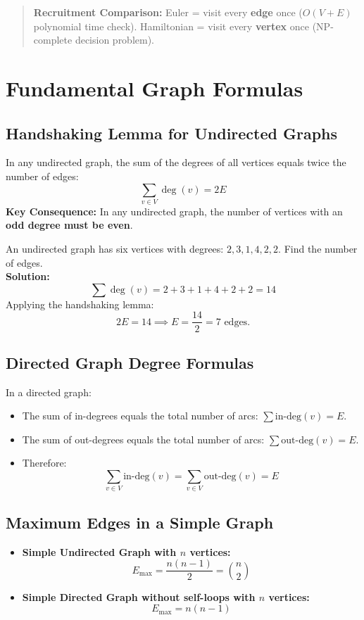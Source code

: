 \begin{quote}
\textbf{Recruitment Comparison:} Euler = visit every \textbf{edge} once ($O(V+E)$ polynomial time check). Hamiltonian = visit every \textbf{vertex} once (NP-complete decision problem).
\end{quote}

\section{Fundamental Graph Formulas}

\subsection{Handshaking Lemma for Undirected Graphs}
In any undirected graph, the sum of the degrees of all vertices equals twice the number of edges:
\[
\boxed{\sum_{v \in V} \deg(v) = 2E}
\]
\textbf{Key Consequence:} In any undirected graph, the number of vertices with an \textbf{odd degree must be even}.

\begin{tcolorbox}[title=\textbf{Worked Example: Handshaking Lemma}]
An undirected graph has six vertices with degrees: $2, 3, 1, 4, 2, 2$. Find the number of edges.\\
\textbf{Solution:}
\[
\sum \deg(v) = 2 + 3 + 1 + 4 + 2 + 2 = 14
\]
Applying the handshaking lemma:
\[
2E = 14 \implies E = \frac{14}{2} = 7 \text{ edges.}
\]
\end{tcolorbox}

\subsection{Directed Graph Degree Formulas}
In a directed graph:
\begin{itemize}
    \item The sum of in-degrees equals the total number of arcs: $\sum \text{in-deg}(v) = E$.
    \item The sum of out-degrees equals the total number of arcs: $\sum \text{out-deg}(v) = E$.
    \item Therefore:
    \[
    \boxed{\sum_{v \in V} \text{in-deg}(v) = \sum_{v \in V} \text{out-deg}(v) = E}
    \]
\end{itemize}

\subsection{Maximum Edges in a Simple Graph}
\begin{itemize}
    \item \textbf{Simple Undirected Graph with $n$ vertices:}
    \[
    \boxed{E_{\max} = \frac{n(n-1)}{2} = \binom{n}{2}}
    \]
    \item \textbf{Simple Directed Graph without self-loops with $n$ vertices:}
    \[
    \boxed{E_{\max} = n(n-1)}
    \]
\end{itemize}

